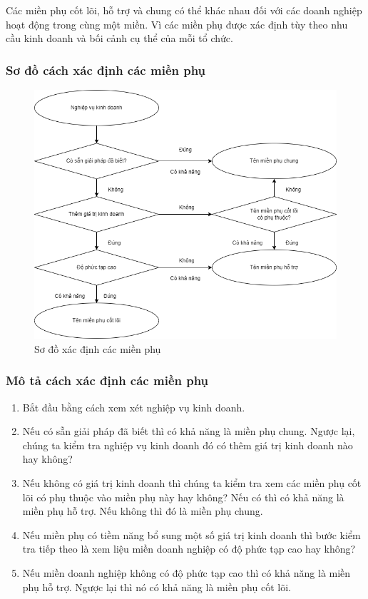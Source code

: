  

Các miền phụ cốt lõi, hỗ trợ và chung có thể khác nhau đối với các doanh nghiệp hoạt động trong cùng một miền. Vì các miền phụ được xác định tùy theo nhu cầu kinh doanh và bối cảnh cụ thể của mỗi tổ chức.

\subsubsection{Sơ đồ cách xác định các miền phụ}

\begin{figure}[H]

    \centering

    \includegraphics[width = 1\textwidth]{pictures/XacDinhMienPhu/main.drawio.png}

    \caption{Sơ đồ xác định các miền phụ}

\end{figure}

\subsubsection{Mô tả cách xác định các miền phụ}

\begin{enumerate}
    \item    Bắt đầu bằng cách xem xét nghiệp vụ kinh doanh.
    \item    Nếu có sẵn giải pháp đã biết thì có khả năng là miền phụ chung. Ngược lại, chúng ta kiểm tra     nghiệp vụ kinh doanh      đó có thêm giá trị kinh doanh nào hay  không?
    \item    Nếu không có giá trị kinh doanh thì chúng ta kiểm tra xem các miền phụ cốt lõi có phụ thuộc vào miền phụ này hay không? Nếu có thì có khả năng là miền phụ hỗ trợ. Nếu không thì đó là miền phụ chung.
    \item    Nếu miền phụ có tiềm năng bổ sung một số giá trị kinh doanh thì bước kiểm tra tiếp theo là xem liệu miền doanh nghiệp có độ phức tạp cao hay không?
    \item    Nếu miền doanh nghiệp không có độ phức tạp cao thì có khả năng là miền phụ hỗ trợ. Ngược lại thì nó có khả năng là miền phụ cốt lõi.
\end{enumerate}
 
